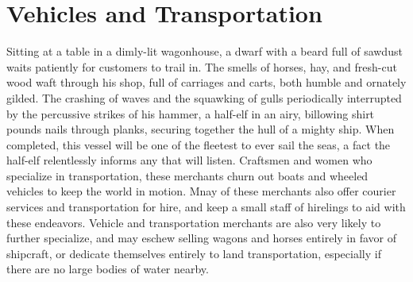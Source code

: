 \documentclass[10pt,a4paper,twoside,twocolumn,openany,nodeprecatedcode,bg=print]{dndbook}
\begin{document}
\section{Vehicles and Transportation}
Sitting at a table in a dimly-lit wagonhouse, a dwarf with a beard full of sawdust waits patiently for customers to trail in. The smells of horses, hay, and fresh-cut wood waft through his shop, full of carriages and carts, both humble and ornately gilded.
The crashing of waves and the squawking of gulls periodically interrupted by the percussive strikes of his hammer, a half-elf in an airy, billowing shirt pounds nails through planks, securing together the hull of a mighty ship. When completed, this vessel will be one of the fleetest to ever sail the seas, a fact the half-elf relentlessly informs any that will listen.
Craftsmen and women who specialize in transportation, these merchants churn out boats and wheeled vehicles to keep the world in motion. Mnay of these merchants also offer courier services and transportation for hire, and keep a small staff of hirelings to aid with these endeavors. Vehicle and transportation merchants are also very likely to further specialize, and may eschew selling wagons and horses entirely in favor of shipcraft, or dedicate themselves entirely to land transportation, especially if there are no large bodies of water nearby.
\end{document}
